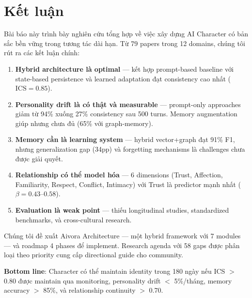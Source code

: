 \section{Kết luận}

Bài báo này trình bày nghiên cứu tổng hợp về việc xây dựng AI Character có bản sắc bền vững trong tương tác dài hạn. Từ 79 papers trong 12 domains, chúng tôi rút ra các kết luận chính:

\begin{enumerate}
    \item \textbf{Hybrid architecture là optimal} --- kết hợp prompt-based baseline với state-based persistence và learned adaptation đạt consistency cao nhất ($\text{ICS}=0.85$).

    \item \textbf{Personality drift là có thật và measurable} --- prompt-only approaches giảm từ 94\% xuống 27\% consistency sau 500 turns. Memory augmentation giúp nhưng chưa đủ (65\% với graph-memory).

    \item \textbf{Memory cần là learning system} --- hybrid vector+graph đạt 91\% F1, nhưng generalization gap (34pp) và forgetting mechanisms là challenges chưa được giải quyết.

    \item \textbf{Relationship có thể model hóa} --- 6 dimensions (Trust, Affection, Familiarity, Respect, Conflict, Intimacy) với Trust là predictor mạnh nhất ($\beta=0.43$--$0.58$).

    \item \textbf{Evaluation là weak point} --- thiếu longitudinal studies, standardized benchmarks, và cross-cultural research.
\end{enumerate}

Chúng tôi đề xuất Aivora Architecture --- một hybrid framework với 7 modules --- và roadmap 4 phases để implement. Research agenda với 58 gaps được phân loại theo priority cung cấp directional guide cho community.

\textbf{Bottom line}: Character có thể maintain identity trong 180 ngày nếu ICS $>$ 0.80 được maintain qua monitoring, personality drift $<$ 5\%/tháng, memory accuracy $>$ 85\%, và relationship continuity $>$ 0.70.





